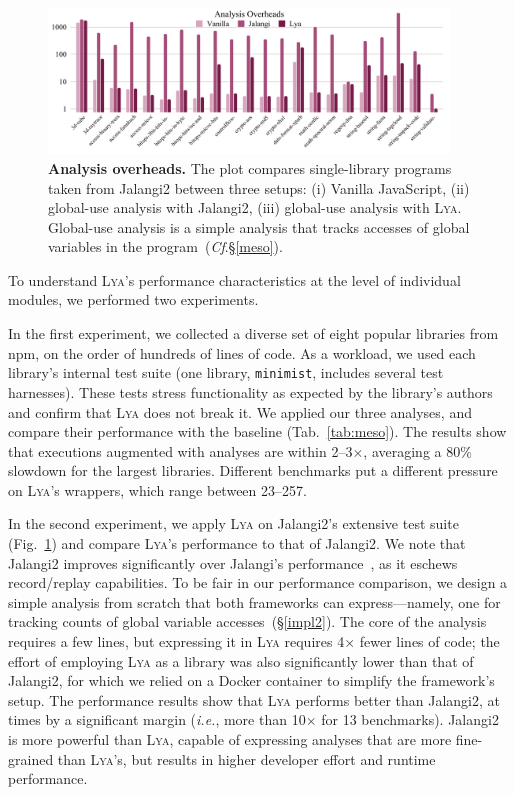 \documentclass[letterpaper,twocolumn,10pt]{article}
\def\ie{{\em i.e.}, }
\newcommand{\ttt}[1]{\texttt{#1}}
\newcommand{\cf}[1]{(\emph{Cf}.\S\ref{#1})}
\newcommand{\sx}[1]{(\S\ref{#1})}
\newcommand{\sys}{{\scshape Lya}\xspace}
\begin{document}
\begin{figure}[t]
  \centering
   \includegraphics[width=0.95\textwidth]{./figs/meso.pdf}
  \caption{
    \textbf{Analysis overheads.}
    The plot compares single-library programs taken from Jalangi2 between three setups:
		(i) Vanilla JavaScript, (ii) global-use analysis with Jalangi2, (iii) global-use analysis with \sys.
    Global-use analysis is a simple analysis that tracks accesses of global variables in the program~\cf{meso}.
  }
  \label{fig:meso}
  \vspace{-3mm}
\end{figure}


To understand \sys's performance characteristics at the level of individual modules, we performed two experiments.

In the first experiment, we collected a diverse set of eight popular libraries from npm, 
on the order of hundreds of lines of code.
As a workload, we used each library's internal test suite (one library, \ttt{minimist}, includes several test harnesses).
These tests stress functionality as expected by the library's authors and confirm that \sys does not break it.
We applied our three analyses, and compare their performance with the baseline (Tab.~\ref{tab:meso}).
The results show that executions augmented with analyses are within 2--3$\times$, averaging a 80\% slowdown for the largest libraries.
Different benchmarks put a different pressure on \sys's wrappers, which range between 23--257. %

In the second experiment, we apply \sys on Jalangi2's extensive test suite (Fig.~\ref{fig:meso}) and compare \sys's performance to that of Jalangi2.
We note that Jalangi2 improves significantly over Jalangi's performance~\cite{jalangi}, as it eschews record/replay capabilities.
To be fair in our performance comparison, we design a simple analysis from scratch that both frameworks can express---namely, one for tracking counts of global variable accesses~\sx{impl2}.
The core of the analysis requires a few lines, but expressing it in \sys requires 4$\times$ fewer lines of code;
  the effort of employing \sys as a library was also significantly lower than that of Jalangi2, for which we relied on a Docker container to simplify the framework's setup.
The performance results show that \sys performs better than Jalangi2, at times by a significant margin (\ie more than 10$\times$ for 13 benchmarks).
Jalangi2 is more powerful than \sys, capable of expressing analyses that are more fine-grained than \sys's, but results in higher developer effort and runtime performance.
\end{document}
